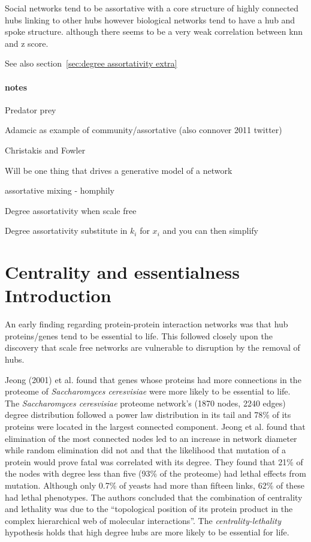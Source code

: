 Social networks tend to be assortative with a core structure of highly connected hubs linking to other hubs\cite{newman2018networks} however biological networks tend to have a hub and spoke structure.  
 although there seems to be a very weak correlation between knn and z score. 


See also section~\ref{sec:degree assortativity extra}

\paragraph{notes}

Predator prey

Adamcic as example of community/assortative (also connover 2011 twitter)

Christakis and Fowler


Will be one thing that drives a generative model of a network

assortative mixing - homphily   

Degree assortativity when scale free

Degree assortativity substitute in $k_i$ for $x_i$ and you can then simplify
\section{Centrality and essentialness Introduction}
\label{sec:Degree and essentialness}
An early finding regarding protein-protein interaction networks was that hub proteins/genes tend to be essential to life. This followed closely upon the discovery that scale free networks are vulnerable to disruption by the removal of hubs\cite{albert2000error}.

Jeong (2001) \cite{jeong2001lethality} et al. found that genes whose proteins had more connections in the proteome of \textit{Saccharomyces ceresvisiae} were more likely to be essential to life. The  \textit{Saccharomyces ceresvisiae} proteome network's (1870 nodes, 2240 edges) degree distribution followed a power law distribution in its tail and 78\% of its proteins were located in the largest connected component. Jeong et al. found that elimination of the most connected nodes led to an increase in network diameter while random elimination did not and that the likelihood that mutation of a protein would prove fatal was correlated with its degree. They found that 21\% of the nodes with degree less than five (93\% of the proteome) had lethal effects from mutation. Although only 0.7\% of yeasts had more than fifteen links,  62\% of these had lethal phenotypes. The authors \cite{jeong2001lethality} concluded that the combination of centrality and lethality was due to the ``topological position of its protein product in the complex hierarchical web of molecular interactions''. The \textit{centrality-lethality} hypothesis holds that high degree hubs are more likely to be essential for life\cite{zotenko2008hubs}. 


